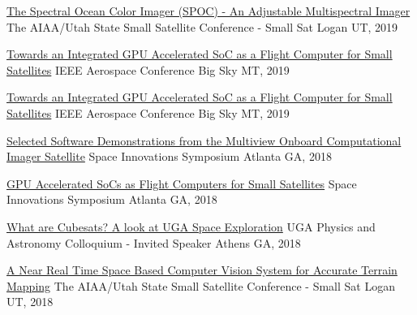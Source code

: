 \documentclass[10pt,a4paper]{article}
\begin{document}
\headedsection
  {{\color{bluegreen} \faStickyNoteO} \href{http://smallsat.uga.edu/images/documents/papers/david_smallsat_2019_paper.pdf}{The Spectral Ocean Color Imager (SPOC) - An Adjustable Multispectral Imager}}{%
  \headedsubsection
    {The AIAA/Utah State Small Satellite Conference - Small Sat}
    {Logan UT, 2019}
    {}
}

\headedsection
  {{\color{bluegreen} \faStickyNoteO} \href{http://smallsat.uga.edu/images/documents/papers/Adams_GPU_Paper.pdf}{Towards an Integrated GPU Accelerated SoC as a Flight Computer for Small Satellites}}{%
  \headedsubsection
    {IEEE Aerospace Conference}
    {Big Sky MT, 2019}
    {}
}

\headedsection
  {{\color{bluegreen} \faTelevision} \href{http://smallsat.uga.edu/images/documents/presentations/IEEE_Aerospace_GPU_Presentation.pdf}{Towards an Integrated GPU Accelerated SoC as a Flight Computer for Small Satellites}}{%
  \headedsubsection
    {IEEE Aerospace Conference}
    {Big Sky MT, 2019}
    {}
}

\headedsection
  {{\color{bluegreen} \faTelevision} \href{http://smallsat.uga.edu/images/documents/presentations/MOCI_Software_Demo2018.pdf}{Selected Software Demonstrations from the Multiview Onboard Computational Imager Satellite}}{%
  \headedsubsection
    {Space Innovations Symposium}
    {Atlanta GA, 2018}
    {}
}

\headedsection
  {{\color{bluegreen} \faMapO} \href{http://smallsat.uga.edu/images/documents/posters/GPU_SmallSatposter.pdf}{GPU Accelerated SoCs as Flight Computers for Small Satellites}}{%
  \headedsubsection
    {Space Innovations Symposium}
    {Atlanta GA, 2018}
    {}
}

\headedsection
  {{\color{bluegreen} \faTelevision} \href{http://smallsat.uga.edu/}{What are Cubesats? A look at UGA Space Exploration}}{%
  \headedsubsection
    {UGA Physics and Astronomy Colloquium - Invited Speaker}
    {Athens GA, 2018}
    {}
}

\headedsection
  {{\color{bluegreen} \faStickyNoteO} \href{http://smallsat.uga.edu/images/documents/papers/Adams_32nd_SmallSatConference.pdf}{A Near Real Time Space Based Computer Vision System for Accurate Terrain Mapping}}{%
  \headedsubsection
    {The AIAA/Utah State Small Satellite Conference - Small Sat}
    {Logan UT, 2018}
    {}
}
\end{document}
